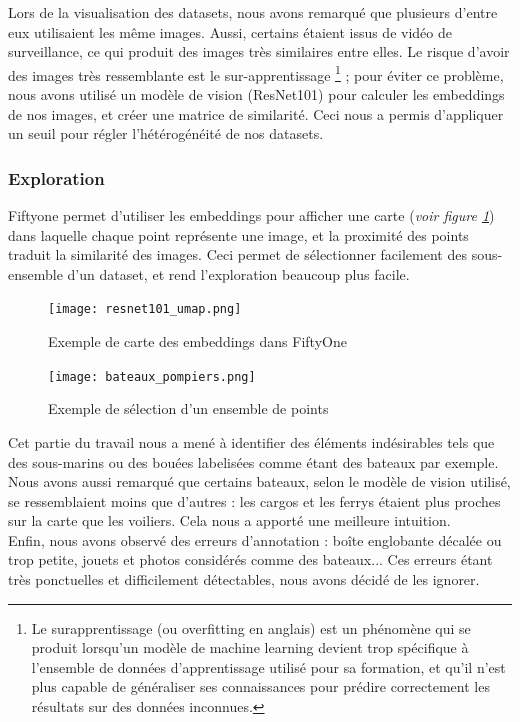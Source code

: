 Lors de la visualisation des datasets, nous avons remarqué que plusieurs d'entre eux utilisaient les
même images. Aussi, certains étaient issus de vidéo de surveillance, ce qui produit des images
très similaires entre elles. Le risque d'avoir des images très ressemblante est le sur-apprentissage
\footnote{Le surapprentissage (ou overfitting en anglais) est un phénomène qui se produit
lorsqu'un modèle de machine learning devient trop spécifique à l'ensemble de données d'apprentissage
utilisé pour sa formation, et qu'il n'est plus capable de généraliser ses connaissances
pour prédire correctement les résultats sur des données inconnues.} ; pour éviter ce problème,
nous avons utilisé un modèle de vision (ResNet101) pour calculer les embeddings de nos images,
et créer une matrice de similarité. Ceci nous a permis d'appliquer un seuil pour régler l'hétérogénéité
de nos datasets.

\subsubsection{Exploration}

Fiftyone permet d'utiliser les embeddings pour afficher une carte (\textit{voir figure \ref{carte_similarite}})
    dans laquelle chaque point représente
une image, et la proximité des points traduit la similarité des images.
Ceci permet de sélectionner facilement des sous-ensemble d'un dataset, et rend l'exploration beaucoup
plus facile.

\begin{figure}[H]
    \centering
    \texttt{[image: resnet101\_umap.png]}
    \caption{Exemple de carte des embeddings dans FiftyOne}\label{carte_similarite}
\end{figure}

\begin{figure}[H]
    \centering
    \texttt{[image: bateaux\_pompiers.png]}
    \caption{Exemple de sélection d'un ensemble de points}
\end{figure}

Cet partie du travail nous a mené à identifier des éléments indésirables tels que des sous-marins ou
des bouées labelisées comme étant des bateaux par exemple. Nous avons aussi remarqué que certains bateaux,
selon le modèle de vision utilisé, se ressemblaient moins que d'autres : les cargos et les ferrys étaient
plus proches sur la carte que les voiliers. Cela nous a apporté une meilleure intuition.\\

Enfin, nous avons observé des erreurs d'annotation : boîte englobante décalée ou trop petite,
jouets et photos considérés comme des bateaux... Ces erreurs étant très ponctuelles et difficilement
détectables, nous avons décidé de les ignorer.\\

